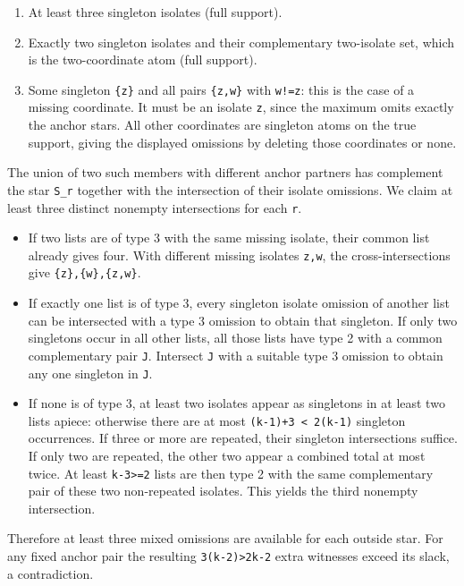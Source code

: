 \documentclass[11pt,letterpaper]{article}
\providecommand{\tightlist}{\setlength{\itemsep}{0pt}\setlength{\parskip}{0pt}}
\begin{document}
\begin{enumerate}
\def\labelenumi{\arabic{enumi}.}
\tightlist
\item
  At least three singleton isolates (full support).
\item
  Exactly two singleton isolates and their complementary two-isolate
  set, which is the two-coordinate atom (full support).
\item
  Some singleton \texttt{\{z\}} and all pairs \texttt{\{z,w\}} with
  \texttt{w!=z}: this is the case of a missing coordinate. It must be an
  isolate \texttt{z}, since the maximum omits exactly the anchor stars.
  All other coordinates are singleton atoms on the true support, giving
  the displayed omissions by deleting those coordinates or none.
\end{enumerate}

The union of two such members with different anchor partners has
complement the star \texttt{S\_r} together with the intersection of
their isolate omissions. We claim at least three distinct nonempty
intersections for each \texttt{r}.

\begin{itemize}
\tightlist
\item
  If two lists are of type 3 with the same missing isolate, their common
  list already gives four. With different missing isolates \texttt{z,w},
  the cross-intersections give \texttt{\{z\},\{w\},\{z,w\}}.
\item
  If exactly one list is of type 3, every singleton isolate omission of
  another list can be intersected with a type 3 omission to obtain that
  singleton. If only two singletons occur in all other lists, all those
  lists have type 2 with a common complementary pair \texttt{J}.
  Intersect \texttt{J} with a suitable type 3 omission to obtain any one
  singleton in \texttt{J}.
\item
  If none is of type 3, at least two isolates appear as singletons in at
  least two lists apiece: otherwise there are at most
  \texttt{(k-1)+3\ \textless{}\ 2(k-1)} singleton occurrences. If three
  or more are repeated, their singleton intersections suffice. If only
  two are repeated, the other two appear a combined total at most twice.
  At least \texttt{k-3\textgreater{}=2} lists are then type 2 with the
  same complementary pair of these two non-repeated isolates. This
  yields the third nonempty intersection.
\end{itemize}

Therefore at least three mixed omissions are available for each outside
star. For any fixed anchor pair the resulting
\texttt{3(k-2)\textgreater{}2k-2} extra witnesses exceed its slack, a
contradiction.
\end{document}
